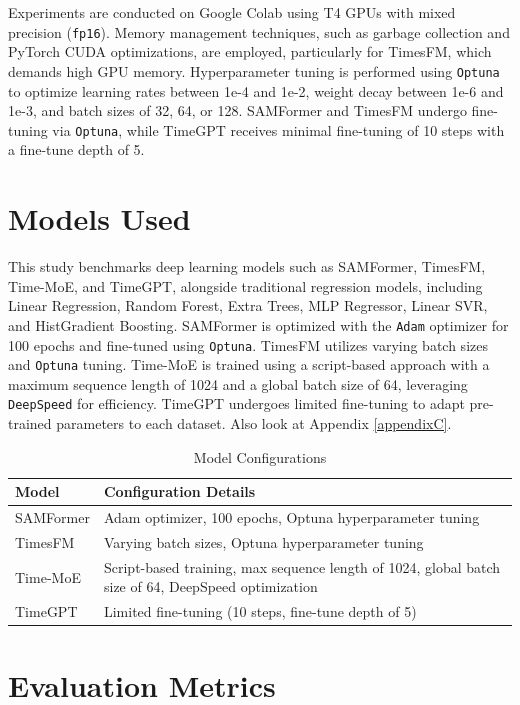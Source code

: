 Experiments are conducted on Google Colab using T4 GPUs with mixed precision (\texttt{fp16}). Memory management techniques, such as garbage collection and PyTorch CUDA optimizations, are employed, particularly for TimesFM, which demands high GPU memory. Hyperparameter tuning is performed using \texttt{Optuna} to optimize learning rates between 1e-4 and 1e-2, weight decay between 1e-6 and 1e-3, and batch sizes of 32, 64, or 128. SAMFormer and TimesFM undergo fine-tuning via \texttt{Optuna}, while TimeGPT receives minimal fine-tuning of 10 steps with a fine-tune depth of 5.

\section{Models Used}

This study benchmarks deep learning models such as SAMFormer, TimesFM, Time-MoE, and TimeGPT, alongside traditional regression models, including Linear Regression, Random Forest, Extra Trees, MLP Regressor, Linear SVR, and HistGradient Boosting. SAMFormer is optimized with the \texttt{Adam} optimizer for 100 epochs and fine-tuned using \texttt{Optuna}. TimesFM utilizes varying batch sizes and \texttt{Optuna} tuning. Time-MoE is trained using a script-based approach with a maximum sequence length of 1024 and a global batch size of 64, leveraging \texttt{DeepSpeed} for efficiency. TimeGPT undergoes limited fine-tuning to adapt pre-trained parameters to each dataset. Also look at Appendix \ref{appendixC}.

\begin{table}[ht]
\centering
\caption{Model Configurations}
\begin{tabular}{|p{4cm}|p{8cm}|}
\hline
\textbf{Model} & \textbf{Configuration Details} \\
\hline
SAMFormer & Adam optimizer, 100 epochs, Optuna hyperparameter tuning \\
\hline
TimesFM & Varying batch sizes, Optuna hyperparameter tuning \\
\hline
Time-MoE & Script-based training, max sequence length of 1024, global batch size of 64, DeepSpeed optimization \\
\hline
TimeGPT & Limited fine-tuning (10 steps, fine-tune depth of 5) \\
\hline
\end{tabular}
\label{tab:model_configs}
\end{table}

\section{Evaluation Metrics}


